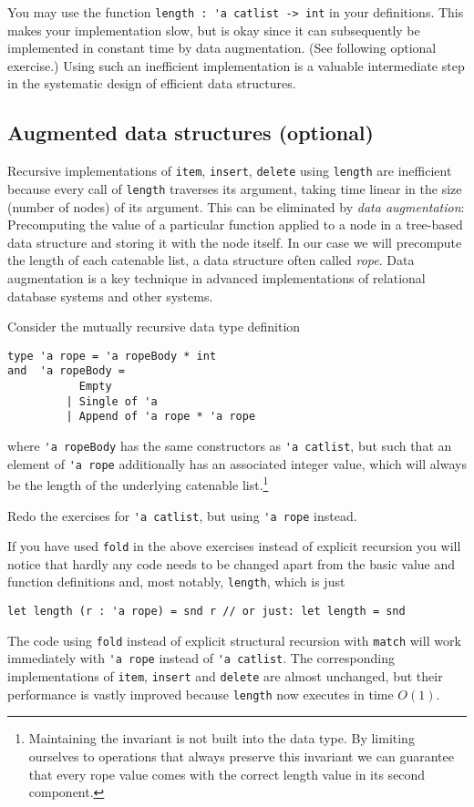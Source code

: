 \documentclass[a4paper,11pt]{article}
\begin{document}
You may use the function \verb|length : 'a catlist -> int| in your definitions. This makes your implementation slow, but is okay since it can subsequently be implemented in constant time by data augmentation. (See following optional exercise.)  Using such an inefficient implementation is a valuable intermediate step in the systematic design of efficient data structures.
 
\subsection{Augmented data structures (optional)}

Recursive implementations of \verb|item|, \verb|insert|, \verb|delete| using \verb|length| are inefficient because every call of \verb|length| traverses its argument, taking time linear in the size (number of nodes) of its argument.  This can be eliminated by \emph{data augmentation}: Precomputing the value of a particular function applied to a node in a tree-based data structure and storing it with the node itself.  In our case we will precompute the length of each catenable list, a data structure often called \emph{rope}.
Data augmentation is a key technique in advanced implementations of relational database systems and other systems.  

Consider the mutually recursive data type definition
\begin{verbatim}
type 'a rope = 'a ropeBody * int  
and  'a ropeBody = 
           Empty 
         | Single of 'a 
         | Append of 'a rope * 'a rope
\end{verbatim}
where \verb|'a ropeBody| has the same constructors as \verb|'a catlist|, but such that an element of \verb|'a rope| additionally has an associated integer value, which will always be the length of the underlying catenable list.\footnote{Maintaining the invariant is not built into the data type. By limiting ourselves to operations that always preserve this invariant we can guarantee that every rope value comes with the correct length value in its second component.}

Redo the exercises for \verb|'a catlist|, but using \verb|'a rope| instead.

If you have used \verb|fold| in the above exercises instead of explicit recursion you will notice that hardly any code needs to be changed apart from the basic value and function definitions and, most notably, \verb|length|, which is just
\begin{verbatim}
let length (r : 'a rope) = snd r // or just: let length = snd
\end{verbatim} 
The code using \verb|fold| instead of explicit structural recursion with \verb|match| will work immediately with \verb|'a rope| instead of \verb|'a catlist|.  The corresponding implementations of \verb|item|, \verb|insert| and \verb|delete| are almost unchanged, but their performance is vastly improved because \verb|length| now executes in time $O(1)$.  
\end{document}
